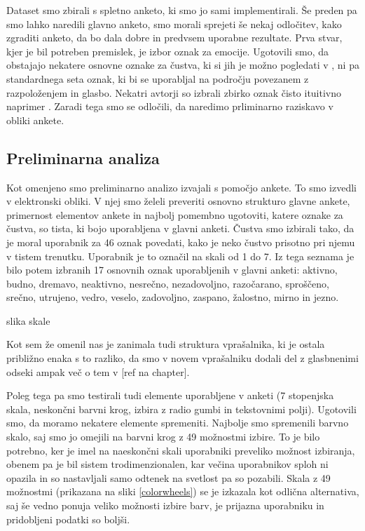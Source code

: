 \documentclass[a4paper, 12pt]{book}
\begin{document}
{Dataset smo zbirali s spletno anketo, ki smo jo sami implementirali. Še preden pa smo lahko naredili glavno anketo, smo morali sprejeti še nekaj odločitev, kako zgraditi anketo, da bo dala dobre in predvsem uporabne rezultate. Prva stvar, kjer je bil potreben premislek, je izbor oznak za emocije. Ugotovili smo, da obstajajo nekatere osnovne oznake za čustva, ki si jih je možno pogledati v \cite{dalgleish1999handbook}, ni pa standardnega seta oznak, ki bi se uporabljal na področju povezanem z razpoloženjem in glasbo. Nekatri avtorji so izbrali zbirko oznak čisto ituitivno naprimer \cite{wu2013spectral}. Zaradi tega smo se odločili, da naredimo prliminarno raziskavo v obliki ankete. 

\subsection{Preliminarna analiza}

Kot omenjeno smo preliminarno analizo izvajali s pomočjo ankete. To smo izvedli v elektronski obliki. V njej smo želeli preveriti osnovno strukturo glavne ankete, primernost elementov ankete in najbolj pomembno ugotoviti, katere oznake za čustva, so tista, ki bojo uporabljena v glavni anketi. Čustva smo izbirali tako, da je moral uporabnik za 46 oznak povedati, kako je neko čustvo prisotno pri njemu v tistem trenutku. Uporabnik je to označil na skali od 1 do 7. Iz tega seznama je bilo potem izbranih 17 osnovnih oznak uporabljenih v glavni anketi: aktivno, budno, dremavo, neaktivno, nesrečno, nezadovoljno, razočarano, sproščeno, srečno, utrujeno, vedro, veselo, zadovoljno, zaspano, žalostno, mirno in jezno.

slika skale

Kot sem že omenil nas je zanimala tudi struktura vprašalnika, ki je ostala približno enaka s to razliko, da smo v novem vprašalniku dodali del z glasbnenimi odseki ampak več o tem v [ref na chapter].

Poleg tega pa smo testirali tudi elemente uporabljene v anketi (7 stopenjska skala, neskončni barvni krog, izbira z radio gumbi in tekstovnimi polji). Ugotovili smo, da moramo nekatere elemente spremeniti. Najbolje smo spremenili barvno skalo, saj smo jo omejili na barvni krog z 49 možnostmi izbire. To je bilo potrebno, ker je imel na naeskončni skali uporabniki preveliko možnost izbiranja, obenem pa je bil sistem trodimenzionalen, kar večina uporabnikov sploh ni opazila in so nastavljali samo odtenek na svetlost pa so pozabili. Skala z 49 možnostmi (prikazana na sliki \ref{colorwheels}) se je izkazala kot odlična alternativa, saj še vedno ponuja veliko možnosti izbire barv, je prijazna uporabniku in pridobljeni podatki so boljši.

}
\end{document}
